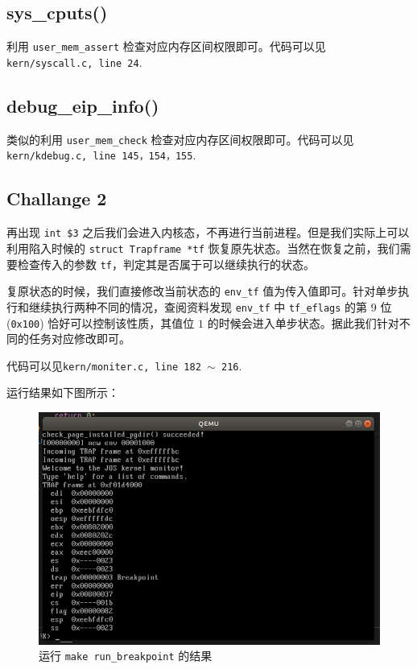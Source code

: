 \documentclass[11pt]{article}
\begin{document}
	\subsection*{sys\_cputs()}
		利用 \texttt{user\_mem\_assert} 检查对应内存区间权限即可。代码可以见\texttt{kern/syscall.c, line 24}.
		
	\subsection*{debug\_eip\_info()}
	类似的利用 \texttt{user\_mem\_check} 检查对应内存区间权限即可。代码可以见\texttt{kern/kdebug.c, line 145，154，155}.
	
	\subsection*{Challange 2}
		
		再出现 \texttt{int \$3} 之后我们会进入内核态，不再进行当前进程。但是我们实际上可以利用陷入时候的 \texttt{struct Trapframe *tf} 恢复原先状态。当然在恢复之前，我们需要检查传入的参数 \texttt{tf}，判定其是否属于可以继续执行的状态。
		
		复原状态的时候，我们直接修改当前状态的 \texttt{env\_tf} 值为传入值即可。针对单步执行和继续执行两种不同的情况，查阅资料发现 \texttt{env\_tf} 中 \texttt{tf\_eflags} 的第 9 位(\texttt{0x100}) 恰好可以控制该性质，其值位 $1$ 的时候会进入单步状态。据此我们针对不同的任务对应修改即可。
		
		代码可以见\texttt{kern/moniter.c, line 182 $\sim$ 216}.
		
		运行结果如下图所示：
		
		
\begin{figure}
\centering
\includegraphics[width=0.7\linewidth]{kern.png}
\caption{运行 \texttt{make run\_breakpoint} 的结果}
\label{fig:kern}
\end{figure}
\end{document}
